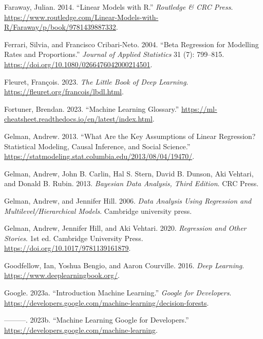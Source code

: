 \documentclass[
  letterpaper,
]{krantz}
\newlength{\cslhangindent}
\newenvironment{CSLReferences}[2] %
 {\begin{list}{}{%
  \setlength{\itemindent}{0pt}
  \setlength{\leftmargin}{0pt}
  \setlength{\parsep}{0pt}
  \ifodd #1
   \setlength{\leftmargin}{\cslhangindent}
   \setlength{\itemindent}{-1\cslhangindent}
  \fi
  \setlength{\itemsep}{#2\baselineskip}}}
 {\end{list}}
\begin{document}
\begin{CSLReferences}{1}{0}
Faraway, Julian. 2014. {``Linear {Models} with {R}.''} \emph{Routledge
\& CRC Press}.
\url{https://www.routledge.com/Linear-Models-with-R/Faraway/p/book/9781439887332}.

Ferrari, Silvia, and Francisco Cribari-Neto. 2004. {``Beta {Regression}
for {Modelling} {Rates} and {Proportions}.''} \emph{Journal of Applied
Statistics} 31 (7): 799--815.
\url{https://doi.org/10.1080/0266476042000214501}.

Fleuret, François. 2023. \emph{The {Little} {Book} of {Deep}
{Learning}}. \url{https://fleuret.org/francois/lbdl.html}.

Fortuner, Brendan. 2023. {``Machine {Learning} {Glossary}.''}
\url{https://ml-cheatsheet.readthedocs.io/en/latest/index.html}.

Gelman, Andrew. 2013. {``What Are the Key Assumptions of Linear
Regression? {\textbar} {Statistical} {Modeling}, {Causal} {Inference},
and {Social} {Science}.''}
\url{https://statmodeling.stat.columbia.edu/2013/08/04/19470/}.

Gelman, Andrew, John B. Carlin, Hal S. Stern, David B. Dunson, Aki
Vehtari, and Donald B. Rubin. 2013. \emph{Bayesian {Data} {Analysis},
{Third} {Edition}}. CRC Press.

Gelman, Andrew, and Jennifer Hill. 2006. \emph{Data Analysis Using
Regression and Multilevel/Hierarchical Models}. Cambridge university
press.

Gelman, Andrew, Jennifer Hill, and Aki Vehtari. 2020. \emph{Regression
and {Other} {Stories}}. 1st ed. Cambridge University Press.
\url{https://doi.org/10.1017/9781139161879}.

Goodfellow, Ian, Yoshua Bengio, and Aaron Courville. 2016. \emph{Deep
{Learning}}. \url{https://www.deeplearningbook.org/}.

Google. 2023a. {``Introduction {\textbar} {Machine} {Learning}.''}
\emph{Google for Developers}.
\url{https://developers.google.com/machine-learning/decision-forests}.

---------. 2023b. {``Machine {Learning} {\textbar} {Google} for
{Developers}.''} \url{https://developers.google.com/machine-learning}.


\end{CSLReferences}
\end{document}
